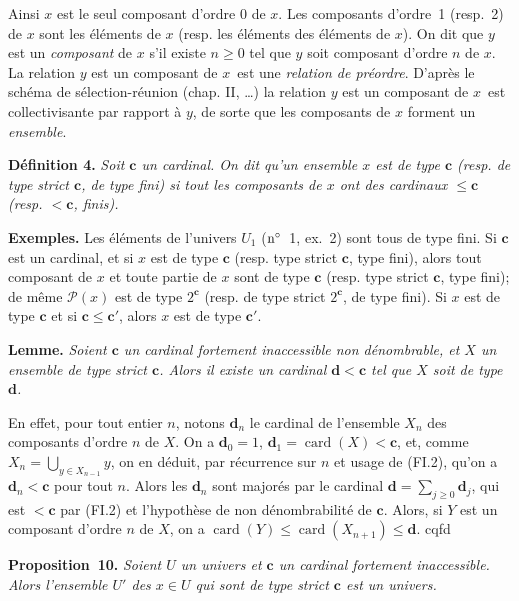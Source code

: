 \documentclass[12pt]{article}
\newcommand{\nn}{\noindent}
\newcommand{\card}{\operatorname{card}}
\begin{document}
Ainsi $x$ est le seul composant d'ordre 0 de $x$. Les composants d'ordre~1 (resp.~2) de $x$ sont les éléments de $x$ (resp. les éléments des éléments de $x$). On dit que $y$ est un \emph{composant} de $x$ s'il existe $n\geq 0$ tel que $y$ soit composant d'ordre $n$ de $x$. La relation \og$y$ est un composant de $x$\fg\ est une \emph{relation de préordre}. D'après le schéma de sélection-réunion (chap. II, \ldots) la relation \og$y$ est un composant de $x$\fg\ est collectivisante par rapport à $y$, de sorte que les composants de $x$ forment un \emph{ensemble}.

\nn\textbf{Définition 4.} \emph{Soit $\mathbf c$ un cardinal. On dit qu'un ensemble $x$ est de type $\mathbf c$ (resp. de type strict $\mathbf c$, de type fini) si tout les composants de $x$ ont des cardinaux $\leq\mathbf c$ (resp. $ < \mathbf c$, finis).}

\nn\textbf{Exemples.} Les éléments de l'univers $U_1$ ($\rm n^\circ$~1, ex.~2) sont tous de type fini. Si $\mathbf c$ est un cardinal, et si $x$ est de type $\mathbf c$ (resp. type strict $\mathbf c$, type fini), alors tout composant de $x$ et toute partie de $x$ sont de type $\mathbf c$ (resp. type strict $\mathbf c$, type fini); de même $\mathcal{P}(x)$ est de type $2^{\mathbf c}$ (resp. de type strict $2^{\mathbf c}$, de type fini). Si $x$ est de type
$\mathbf c$ et si $\mathbf c\leq\mathbf c'$, alors $x$ est de type $\mathbf c'$.

\nn\textbf{Lemme.} \emph{Soient $\mathbf c$ un cardinal fortement inaccessible non dénombrable, et $X$ un ensemble de type strict $\mathbf c$. Alors il existe un cardinal $\mathbf d < \mathbf c$ tel que $X$ soit de type $\mathbf d$.}

En effet, pour tout entier $n$, notons $\mathbf d_n$ le cardinal de l'ensemble $X_n$ des composants d'ordre $n$ de $X$. On a $\mathbf d_0=1$, $\mathbf d_1=\card(X) < \mathbf c$, et, comme $X_n=\bigcup_{y\in X_{n-1}} y$, on en déduit, par récurrence sur $n$ et usage de (FI.2), qu'on a $\mathbf d_n < \mathbf c$ pour tout $n$. Alors les $\mathbf d_n$ sont majorés par le cardinal $\mathbf d=\sum_{j\geq 0}\mathbf d_j$, qui est $ < \mathbf c$ par (FI.2) et l'hypothèse de non dénombrabilité de $\mathbf c$. Alors, si $Y$ est un composant d'ordre $n$ de $X$, on a $\card(Y)\leq \card(X_{n+1})\leq\mathbf d$. cqfd

\nn\textbf{Proposition~10.} \emph{Soient $U$ un univers et $\mathbf c$ un cardinal fortement inaccessible. Alors l'ensemble $U'$ des $x\in U$ qui sont de type strict $\mathbf c$ est un univers.}
\end{document}
